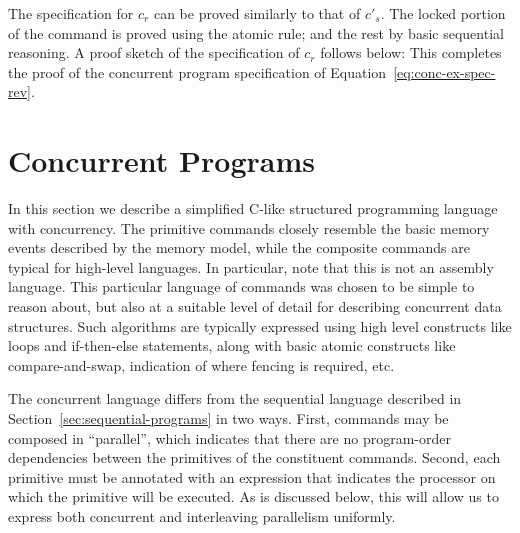 \documentclass[11pt]{report}
\begin{document}
The specification for $c_r$ can be proved similarly to that of $c'_s$. The locked portion of the command is proved using the atomic rule; and the rest by basic sequential reasoning. A proof sketch of the specification of $c_r$ follows below: 
This completes the proof of the concurrent program specification of Equation~\ref{eq:conc-ex-spec-rev}.

\section{Concurrent Programs}
\label{sec:programming-language}

In this section we describe a simplified C-like structured programming language with concurrency. The primitive commands closely resemble the basic memory events described by the memory model, while the composite commands are typical for high-level languages. In particular, note that this is not an assembly language. This particular language of commands was chosen to be simple to reason about, but also at a suitable level of detail for describing concurrent data structures. Such algorithms are typically expressed using high level constructs like loops and if-then-else statements, along with basic atomic constructs like compare-and-swap, indication of where fencing is required, etc. 

The concurrent language differs from the sequential language described in Section~\ref{sec:sequential-programs} in two ways. First, commands may be composed in ``parallel'', which indicates that there are no program-order dependencies between the primitives of the constituent commands. Second, each primitive must be annotated with an expression that indicates the processor on which the primitive will be executed. As is discussed below, this will allow us to express both concurrent and interleaving parallelism uniformly.
\end{document}
